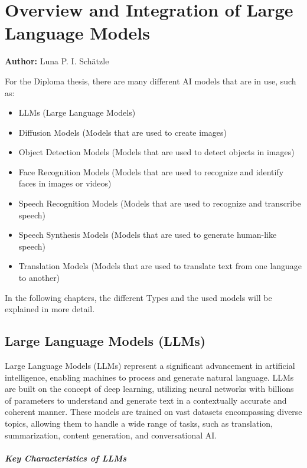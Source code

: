 \chapter{Overview and Integration of Large Language Models}
\label{cha:Introduction_to_the_used_Large_Language_Models}
\textbf{Author:} Luna P. I. Schätzle

For the Diploma thesis, there are many different AI models that are in use, such as:
\begin{itemize}
    \item LLMs (Large Language Models)
    \item Diffusion Models (Models that are used to create images)
    \item Object Detection Models (Models that are used to detect objects in images)
    \item Face Recognition Models (Models that are used to recognize and identify faces in images or videos)
    \item Speech Recognition Models (Models that are used to recognize and transcribe speech)
    \item Speech Synthesis Models (Models that are used to generate human-like speech)
    \item Translation Models (Models that are used to translate text from one language to another)
\end{itemize}

In the following chapters, the different Types and the used models will be explained in more detail.

\section{Large Language Models (LLMs)}

Large Language Models (LLMs) represent a significant advancement in artificial intelligence, enabling machines to process and generate natural language. 
LLMs are built on the concept of deep learning, utilizing neural networks with billions of parameters to understand and generate text in a contextually accurate 
and coherent manner. These models are trained on vast datasets encompassing diverse topics, allowing them to handle a wide range of tasks, such as translation, 
summarization, content generation, and conversational AI.

\paragraph{Key Characteristics of LLMs}

